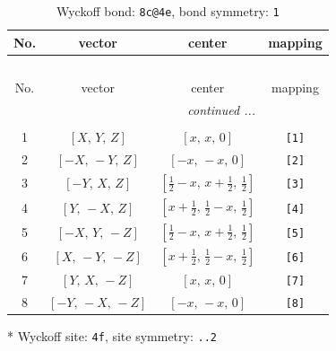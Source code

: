 \documentclass[fleqn,8pt]{jsarticle}
\begin{document}
\renewcommand{\arraystretch}{1.2}
\begin{longtable}{cccc}
\caption{Wyckoff bond: {\tt 8c@4e}, bond symmetry: {\tt 1}}
 \\
 \hline \hline
No. & vector & center & mapping \\ \hline \endfirsthead

\multicolumn{3}{l}{\tablename\ \thetable{}} \\
 \hline \hline
No. & vector & center & mapping \\ \hline \endhead

 \hline \hline
\multicolumn{3}{r}{\footnotesize\it continued ...} \\ \endfoot

 \hline \hline
\multicolumn{3}{r}{} \\ \endlastfoot

1 & $\left[ X,\, Y,\, Z \right]$ & $\left[ x,\, x,\, 0 \right]$ & {\tt [1]} \\ \hline
2 & $\left[ - X,\, - Y,\, Z \right]$ & $\left[ - x,\, - x,\, 0 \right]$ & {\tt [2]} \\ \hline
3 & $\left[ - Y,\, X,\, Z \right]$ & $\left[ \frac{1}{2} - x,\, x + \frac{1}{2},\, \frac{1}{2} \right]$ & {\tt [3]} \\ \hline
4 & $\left[ Y,\, - X,\, Z \right]$ & $\left[ x + \frac{1}{2},\, \frac{1}{2} - x,\, \frac{1}{2} \right]$ & {\tt [4]} \\ \hline
5 & $\left[ - X,\, Y,\, - Z \right]$ & $\left[ \frac{1}{2} - x,\, x + \frac{1}{2},\, \frac{1}{2} \right]$ & {\tt [5]} \\ \hline
6 & $\left[ X,\, - Y,\, - Z \right]$ & $\left[ x + \frac{1}{2},\, \frac{1}{2} - x,\, \frac{1}{2} \right]$ & {\tt [6]} \\ \hline
7 & $\left[ Y,\, X,\, - Z \right]$ & $\left[ x,\, x,\, 0 \right]$ & {\tt [7]} \\ \hline
8 & $\left[ - Y,\, - X,\, - Z \right]$ & $\left[ - x,\, - x,\, 0 \right]$ & {\tt [8]} \\
\end{longtable}
* Wyckoff site: {\tt 4f}, site symmetry: {\tt ..2}
\renewcommand{\arraystretch}{1.2}
\end{document}
